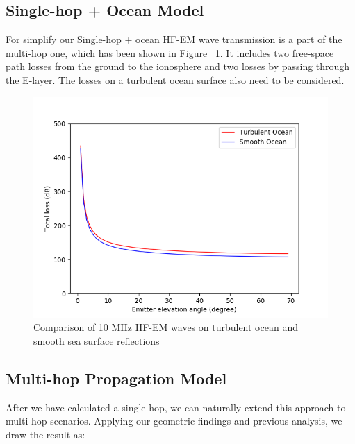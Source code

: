 \documentclass{mcmthesis}
\begin{document}
    \subsection{Single-hop + Ocean Model}

      For simplify our Single-hop + ocean HF-EM wave transmission is a part of the multi-hop one, which has been shown in Figure ~\ref{fig:Multi_hop}. It includes two free-space path losses from the ground to the ionosphere and two losses by passing through the E-layer. The losses on a turbulent ocean surface also need to be considered.

      \begin{figure}[h]
      \centering
      \includegraphics[scale=0.6]{Q1_10MHz}
      \caption{Comparison of 10 MHz HF-EM waves on turbulent ocean and smooth sea surface reflections}
      \label{fig:Multi_hop}
      \end{figure}

    \subsection{Multi-hop Propagation Model}

      After we have calculated a single hop, we can naturally extend this approach to multi-hop scenarios. Applying our geometric findings and previous analysis, we draw the result as:
\end{document}
